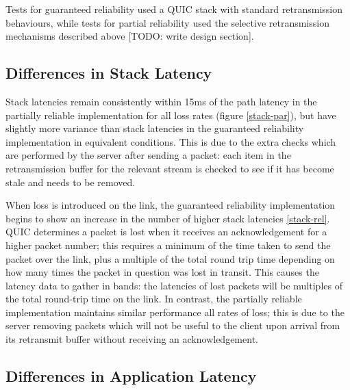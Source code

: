 \documentclass{mpaper}
\begin{document}
Tests for guaranteed reliability used a QUIC stack with standard retransmission behaviours, while tests for partial reliability used the selective retransmission mechanisms described above [TODO: write design section].

\subsection{Differences in Stack Latency}

Stack latencies remain consistently within 15ms of the path latency in the partially reliable implementation for all loss rates (figure \ref{stack-par}), but have slightly more variance than stack latencies in the guaranteed reliability implementation in equivalent conditions. This is due to the extra checks which are performed by the server after sending a packet: each item in the retransmission buffer for the relevant stream is checked to see if it has become stale and needs to be removed.

When loss is introduced on the link, the guaranteed reliability implementation begins to show an increase in the number of higher stack latencies \ref{stack-rel}. QUIC determines a packet is lost when it receives an acknowledgement for a higher packet number; this requires a minimum of the time taken to send the packet over the link, plus a multiple of the total round trip time depending on how many times the packet in question was lost in transit. This causes the latency data to gather in bands: the latencies of lost packets will be multiples of the total round-trip time on the link. In contrast, the partially reliable implementation maintains similar performance all rates of loss; this is due to the server removing packets which will not be useful to the client upon arrival from its retransmit buffer without receiving an acknowledgement.

\subsection{Differences in Application Latency}
\end{document}

